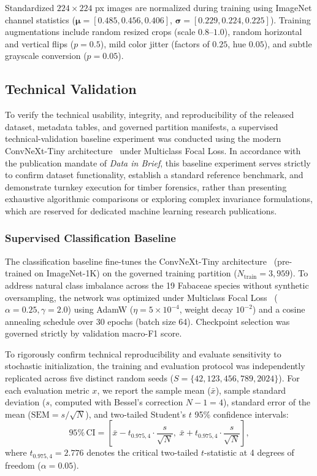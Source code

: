 \documentclass[a4paper,fleqn,12pt]{cas-sc}
\begin{document}
Standardized $224 \times 224$ px images are normalized during training using ImageNet channel statistics ($\boldsymbol{\mu} = [0.485, 0.456, 0.406]$, $\boldsymbol{\sigma} = [0.229, 0.224, 0.225]$). Training augmentations include random resized crops (scale $0.8$--$1.0$), random horizontal and vertical flips ($p = 0.5$), mild color jitter (factors of $0.25$, hue $0.05$), and subtle grayscale conversion ($p = 0.05$).

\subsection{Technical Validation}
\label{sec:technical_validation}

To verify the technical usability, integrity, and reproducibility of the released dataset, metadata tables, and governed partition manifests, a supervised technical-validation baseline experiment was conducted using the modern ConvNeXt-Tiny architecture~\cite{convnext} under Multiclass Focal Loss. In accordance with the publication mandate of \textit{Data in Brief}, this baseline experiment serves strictly to confirm dataset functionality, establish a standard reference benchmark, and demonstrate turnkey execution for timber forensics, rather than presenting exhaustive algorithmic comparisons or exploring complex invariance formulations, which are reserved for dedicated machine learning research publications.

\subsubsection{Supervised Classification Baseline}
\label{sec:classification_baseline}

The classification baseline fine-tunes the ConvNeXt-Tiny architecture~\cite{convnext} (pre-trained on ImageNet-1K) on the governed training partition ($N_{\text{train}} = 3,959$). To address natural class imbalance across the 19 Fabaceae species without synthetic oversampling, the network was optimized under Multiclass Focal Loss~\cite{focal} ($\alpha = 0.25, \gamma = 2.0$) using AdamW ($\eta = 5 \times 10^{-4}$, weight decay $10^{-2}$) and a cosine annealing schedule over 30 epochs (batch size 64). Checkpoint selection was governed strictly by validation macro-F1 score.

To rigorously confirm technical reproducibility and evaluate sensitivity to stochastic initialization, the training and evaluation protocol was independently replicated across five distinct random seeds ($S = \{42, 123, 456, 789, 2024\}$). For each evaluation metric $x$, we report the sample mean ($\bar{x}$), sample standard deviation ($s$, computed with Bessel's correction $N-1 = 4$), standard error of the mean ($\text{SEM} = s / \sqrt{N}$), and two-tailed Student's $t$ 95\% confidence intervals:
\begin{equation}
95\%\,\text{CI} = \left[ \bar{x} - t_{0.975, 4} \cdot \frac{s}{\sqrt{N}}, \; \bar{x} + t_{0.975, 4} \cdot \frac{s}{\sqrt{N}} \right],
\end{equation}
where $t_{0.975, 4} = 2.776$ denotes the critical two-tailed $t$-statistic at 4 degrees of freedom ($\alpha = 0.05$).
\end{document}
